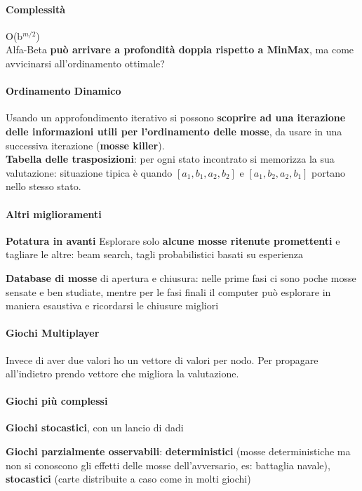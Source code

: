\documentclass[10pt]{book}
\begin{document}
\paragraph{Complessità} O(b$^{m/2}$)\\
Alfa-Beta \textbf{può arrivare a profondità doppia rispetto a MinMax}, ma come avvicinarsi all'ordinamento ottimale?
\paragraph{Ordinamento Dinamico} Usando un approfondimento iterativo si possono \textbf{scoprire ad una iterazione delle informazioni utili per l'ordinamento delle mosse}, da usare in una successiva iterazione (\textbf{mosse killer}).\\
\textbf{Tabella delle trasposizioni}: per ogni stato incontrato si memorizza la sua valutazione: situazione tipica è quando $[a_1, b_1, a_2, b_2]$ e $[a_1, b_2, a_2, b_1]$ portano nello stesso stato.
\paragraph{Altri miglioramenti}\begin{list}{}{}
	\item \textbf{Potatura in avanti} Esplorare solo \textbf{alcune mosse ritenute promettenti} e tagliare le altre: beam search, tagli probabilistici basati su esperienza
	\item \textbf{Database di mosse} di apertura e chiusura: nelle prime fasi ci sono poche mosse sensate e ben studiate, mentre per le fasi finali il computer può esplorare in maniera esaustiva e ricordarsi le chiusure migliori
\end{list}
\paragraph{Giochi Multiplayer} Invece di aver due valori ho un vettore di valori per nodo. Per propagare all'indietro prendo vettore che migliora la valutazione.
\paragraph{Giochi più complessi}
\begin{list}{}{}
	\item \textbf{Giochi stocastici}, con un lancio di dadi
	\item \textbf{Giochi parzialmente osservabili}: \textbf{deterministici} (mosse deterministiche ma non si conoscono gli effetti delle mosse dell'avversario, es: battaglia navale), \textbf{stocastici} (carte distribuite a caso come in molti giochi)
\end{list}
\pagebreak
\end{document}

